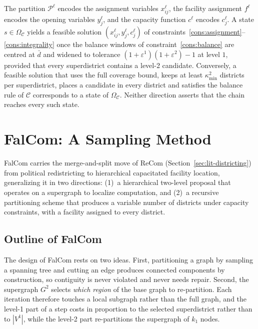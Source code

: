 \documentclass[11pt]{article}
\theoremstyle{definition}
\begin{document}
The partition $\mathcal{P}^\ell$ encodes the assignment variables $x_{ij}^\ell$,
the facility assignment $f^\ell$ encodes the opening variables $y_j^\ell$, and
the capacity function $c^\ell$ encodes $c^{\ell}_j$. A state $s \in \Omega_\mathcal{C}$ yields a feasible solution $(x_{ij}^\ell, y_j^\ell, c^{\ell}_j)$ of constraints~\eqref{cons:assignment}--\eqref{cons:integrality} once the balance windows of constraint~\eqref{cons:balance} are centred at $\bar d$ and widened to tolerance $(1{+}\varepsilon^1)(1{+}\varepsilon^2)-1$ at level $1$, provided that every superdistrict contains a level-2 candidate. Conversely, a feasible solution that uses the full coverage bound, keeps at least $\kappa^2_{\min}$ districts per superdistrict, places a candidate in every district and satisfies the balance rule of $\mathcal{C}$ corresponds to a state of $\Omega_\mathcal{C}$. Neither direction asserts that the chain reaches every such state.



\section{FalCom: A Sampling Method}
\label{sec:falcom}

FalCom carries the merge-and-split move of ReCom (Section~\ref{sec:lit-districting}) from political redistricting to hierarchical capacitated facility location, generalizing it in two directions: (1)~a hierarchical two-level proposal that operates on a supergraph to localize computation, and (2)~a recursive partitioning scheme that produces a variable number of districts under capacity constraints, with a facility assigned to every district.

\subsection{Outline of FalCom}
\label{sec:outline}

The design of FalCom rests on two ideas. First, partitioning a graph by sampling a spanning tree and cutting an edge produces connected components by construction, so contiguity is never violated and never needs repair. Second, the supergraph $G^2$ selects \emph{which region} of the base graph to re-partition. Each iteration therefore touches a local subgraph rather than the full graph, and the level-1 part of a step costs in proportion to the selected superdistrict rather than to $|V^1|$, while the level-2 part re-partitions the supergraph of $k_1$ nodes.
\end{document}
